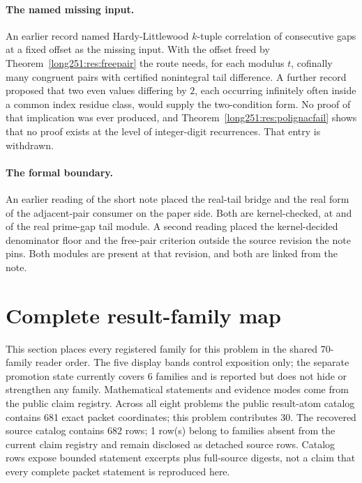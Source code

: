 \documentclass[11pt]{article}
\begin{document}
\paragraph{The named missing input.}  An earlier record named
Hardy-Littlewood $k$-tuple correlation of consecutive gaps at a fixed offset as
the missing input.  With the offset freed by Theorem~\ref{long251:res:freepair} the
route needs, for each modulus $t$, cofinally many congruent pairs with
certified nonintegral tail difference.  A further record proposed that two even
values differing by $2$, each occurring infinitely often inside a common index
residue class, would supply the two-condition form.  No proof of that
implication was ever produced, and Theorem~\ref{long251:res:polignacfail} shows that no
proof exists at the level of integer-digit recurrences.  That entry is
withdrawn.

\paragraph{The formal boundary.}  An earlier reading of the short note placed
the real-tail bridge and the real form of the adjacent-pair consumer on the
paper side.  Both are kernel-checked, at
and
of the real prime-gap tail module.  A second reading placed the kernel-decided
denominator floor and the free-pair criterion outside the source revision the
note pins.  Both modules are present at that revision, and both are linked from
the note.
\clearpage
\section{Complete result-family map}\label{sec:erdos-251-complete-family-map}

This section places every registered family for this problem in the shared 70-family reader order.  The five display bands control exposition only; the separate promotion state currently covers 6 families and is reported but does not hide or strengthen any family.  Mathematical statements and evidence modes come from the public claim registry.  Across all eight problems the public result-atom catalog contains 681 exact packet coordinates; this problem contributes 30.  The recovered source catalog contains 682 rows; 1 row(s) belong to families absent from the current claim registry and remain disclosed as detached source rows.  Catalog rows expose bounded statement excerpts plus full-source digests, not a claim that every complete packet statement is reproduced here.
\end{document}
